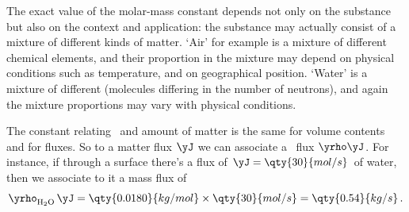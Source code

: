 The exact value of the molar-mass constant depends not only on the substance but also on the context and application: the substance may actually consist of a mixture of different kinds of matter. \enquote*{Air} for example is a mixture of different chemical elements, and their proportion in the mixture may depend on physical conditions such as temperature, and on geographical position.
%
\enquote*{Water} is a mixture of different  (molecules differing in the number of neutrons), and again the mixture proportions may vary with physical conditions.

The constant relating \masse\ and amount of matter is the same for volume contents and for fluxes. So to a matter flux $\yJ$ we can associate a \masse\ flux $\yrho\yJ$. For instance, if through a surface there's a flux of $\yJ=\qty{30}{mol/s}$ of water, then we associate to it a mass flux of
$$\yrho_{\mathrm{H_2O}}\,\yJ = \qty{0.0180}{kg/mol} \times \qty{30}{mol/s} = \qty{0.54}{kg/s}\,.$$

